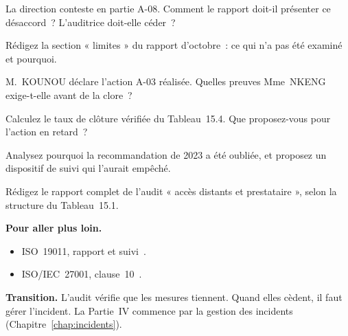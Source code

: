 \begin{boxexo}[title={\ding{45}\quad Exercice~15.5. Le désaccord \niveaumoyen}]
La direction conteste en partie A-08. Comment le rapport doit-il présenter
ce désaccord~? L'auditrice doit-elle céder~?
\end{boxexo}

\begin{boxexo}[title={\ding{45}\quad Exercice~15.6. Les limites \niveaumoyen}]
Rédigez la section « limites » du rapport d'octobre~: ce qui n'a pas été
examiné et pourquoi.
\end{boxexo}

\begin{boxexo}[title={\ding{45}\quad Exercice~15.7. Clore \niveaumoyen}]
M.~KOUNOU déclare l'action A-03 réalisée. Quelles preuves Mme~NKENG
exige-t-elle avant de la clore~?
\end{boxexo}

\begin{boxexo}[title={\ding{45}\quad Exercice~15.8. Le suivi \niveaumoyen}]
Calculez le taux de clôture vérifiée du Tableau~15.4. Que proposez-vous
pour l'action en retard~?
\end{boxexo}

\begin{boxexo}[title={\ding{45}\quad Exercice~15.9. La recommandation de 2023 \niveauexpert}]
Analysez pourquoi la recommandation de 2023 a été oubliée, et proposez un
dispositif de suivi qui l'aurait empêché.
\end{boxexo}

\begin{boxexo}[title={\ding{45}\quad Exercice~15.10. Un rapport complet \niveauexpert}]
Rédigez le rapport complet de l'audit « accès distants et prestataire »,
selon la structure du Tableau~15.1.
\end{boxexo}

\bigskip

\begin{boxinfo}
\textbf{Pour aller plus loin.}
\begin{itemize}
    \item ISO~19011, rapport et suivi~\cite{iso19011_2018}.
    \item ISO/IEC~27001, clause~10~\cite{iso27001_2022}.
\end{itemize}
\end{boxinfo}

\begin{boxinfo}
\textbf{Transition.} L'audit vérifie que les mesures tiennent. Quand
elles cèdent, il faut gérer l'incident. La Partie~IV commence par la
gestion des incidents (Chapitre~\ref{chap:incidents}).
\end{boxinfo}
